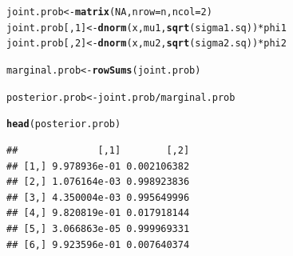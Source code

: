 \documentclass[11pt, a4paper]{article}\usepackage[]{graphicx}\usepackage[]{xcolor}
\makeatletter
\newcommand{\hlnum}[1]{\textcolor[rgb]{0.686,0.059,0.569}{#1}}%
\newcommand{\hlopt}[1]{\textcolor[rgb]{0,0,0}{#1}}%
\newcommand{\hldef}[1]{\textcolor[rgb]{0.345,0.345,0.345}{#1}}%
\newcommand{\hlkwb}[1]{\textcolor[rgb]{0.69,0.353,0.396}{#1}}%
\newcommand{\hlkwc}[1]{\textcolor[rgb]{0.333,0.667,0.333}{#1}}%
\newcommand{\hlkwd}[1]{\textcolor[rgb]{0.737,0.353,0.396}{\textbf{#1}}}%
\newenvironment{kframe}{%
 \def\at@end@of@kframe{}%
 \ifinner\ifhmode%
  \def\at@end@of@kframe{\end{minipage}}%
  \begin{minipage}{\columnwidth}%
 \fi\fi%
 \def\FrameCommand##1{\hskip\@totalleftmargin \hskip-\fboxsep
 \colorbox{shadecolor}{##1}\hskip-\fboxsep
     \hskip-\linewidth \hskip-\@totalleftmargin \hskip\columnwidth}%
 \MakeFramed {\advance\hsize-\width
   \@totalleftmargin\z@ \linewidth\hsize
   \@setminipage}}%
 {\par\unskip\endMakeFramed%
 \at@end@of@kframe}
\newenvironment{knitrout}{}{} %
\makeatother
\begin{document}
\begin{enumerate}
\begin{knitrout}
\color{fgcolor}\begin{kframe}
\begin{alltt}
\hldef{joint.prob} \hlkwb{<-} \hlkwd{matrix}\hldef{(}\hlnum{NA}\hldef{,} \hlkwc{nrow} \hldef{= n,} \hlkwc{ncol} \hldef{=} \hlnum{2}\hldef{)}
\hldef{joint.prob[,}\hlnum{1}\hldef{]} \hlkwb{<-} \hlkwd{dnorm}\hldef{(x, mu1,} \hlkwd{sqrt}\hldef{(sigma1.sq))} \hlopt{*} \hldef{phi1}
\hldef{joint.prob[,}\hlnum{2}\hldef{]} \hlkwb{<-} \hlkwd{dnorm}\hldef{(x, mu2,} \hlkwd{sqrt}\hldef{(sigma2.sq))} \hlopt{*} \hldef{phi2}
\end{alltt}
\end{kframe}
\end{knitrout}

\begin{knitrout}
\color{fgcolor}\begin{kframe}
\begin{alltt}
\hldef{marginal.prob} \hlkwb{<-} \hlkwd{rowSums}\hldef{(joint.prob)}
\end{alltt}
\end{kframe}
\end{knitrout}

\begin{knitrout}
\color{fgcolor}\begin{kframe}
\begin{alltt}
\hldef{posterior.prob} \hlkwb{<-} \hldef{joint.prob} \hlopt{/} \hldef{marginal.prob}
\end{alltt}
\end{kframe}
\end{knitrout}

\begin{knitrout}
\color{fgcolor}\begin{kframe}
\begin{alltt}
\hlkwd{head}\hldef{(posterior.prob)}
\end{alltt}
\begin{verbatim}
##              [,1]        [,2]
## [1,] 9.978936e-01 0.002106382
## [2,] 1.076164e-03 0.998923836
## [3,] 4.350004e-03 0.995649996
## [4,] 9.820819e-01 0.017918144
## [5,] 3.066863e-05 0.999969331
## [6,] 9.923596e-01 0.007640374
\end{verbatim}
\end{kframe}
\end{knitrout}


\end{enumerate}
\end{document}
